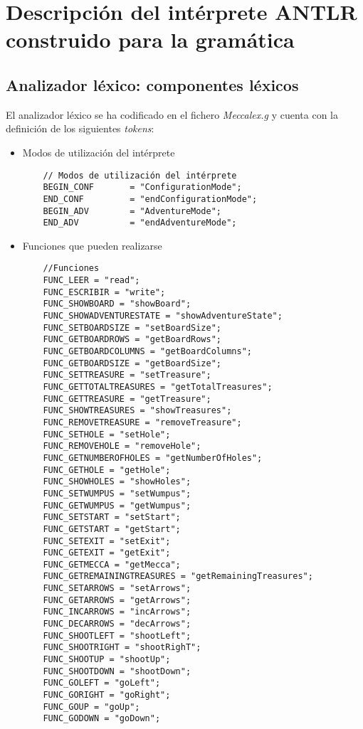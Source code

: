 \documentclass[a4paper,12pt,twoside,openright]{report}
\begin{document}
\chapter{Descripción del intérprete ANTLR construido para la gramática \label{defantlr}}
  \section{Analizador léxico: componentes léxicos}
  El analizador léxico se ha codificado en el fichero \emph{Meccalex.g} y cuenta con la definición de los siguientes \emph{tokens}:
  \begin{itemize}
   \item Modos de utilización del intérprete
   \begin{lstlisting}
    // Modos de utilización del intérprete
    BEGIN_CONF       = "ConfigurationMode";
    END_CONF         = "endConfigurationMode";
    BEGIN_ADV        = "AdventureMode";
    END_ADV          = "endAdventureMode";
   \end{lstlisting}
   
   \item Funciones que pueden realizarse
   \begin{lstlisting}
    //Funciones
    FUNC_LEER = "read";
    FUNC_ESCRIBIR = "write";
    FUNC_SHOWBOARD = "showBoard";
    FUNC_SHOWADVENTURESTATE = "showAdventureState";
    FUNC_SETBOARDSIZE = "setBoardSize";
    FUNC_GETBOARDROWS = "getBoardRows";
    FUNC_GETBOARDCOLUMNS = "getBoardColumns";
    FUNC_GETBOARDSIZE = "getBoardSize";
    FUNC_SETTREASURE = "setTreasure";
    FUNC_GETTOTALTREASURES = "getTotalTreasures";
    FUNC_GETTREASURE = "getTreasure";
    FUNC_SHOWTREASURES = "showTreasures";    
    FUNC_REMOVETREASURE = "removeTreasure";
    FUNC_SETHOLE = "setHole";
    FUNC_REMOVEHOLE = "removeHole";
    FUNC_GETNUMBEROFHOLES = "getNumberOfHoles";
    FUNC_GETHOLE = "getHole";
    FUNC_SHOWHOLES = "showHoles";
    FUNC_SETWUMPUS = "setWumpus";
    FUNC_GETWUMPUS = "getWumpus";
    FUNC_SETSTART = "setStart";
    FUNC_GETSTART = "getStart";
    FUNC_SETEXIT = "setExit";
    FUNC_GETEXIT = "getExit";
    FUNC_GETMECCA = "getMecca";
    FUNC_GETREMAININGTREASURES = "getRemainingTreasures";
    FUNC_SETARROWS = "setArrows";
    FUNC_GETARROWS = "getArrows";
    FUNC_INCARROWS = "incArrows";
    FUNC_DECARROWS = "decArrows";
    FUNC_SHOOTLEFT = "shootLeft";
    FUNC_SHOOTRIGHT = "shootRighT";
    FUNC_SHOOTUP = "shootUp";
    FUNC_SHOOTDOWN = "shootDown";
    FUNC_GOLEFT = "goLeft";
    FUNC_GORIGHT = "goRight";
    FUNC_GOUP = "goUp";
    FUNC_GODOWN = "goDown";
    \end{lstlisting}
    

\end{itemize}
\end{document}
